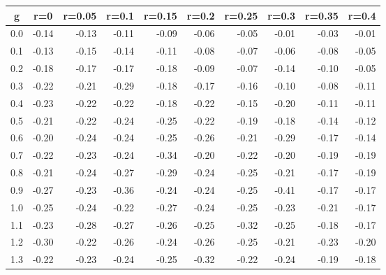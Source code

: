 %
\begin{table}[!tbp]
 \begin{center}
 \begin{tabular}{rrrrrrrrrr}\hline\hline
\multicolumn{1}{c}{g}&\multicolumn{1}{c}{r=0}&\multicolumn{1}{c}{r=0.05}&\multicolumn{1}{c}{r=0.1}&\multicolumn{1}{c}{r=0.15}&\multicolumn{1}{c}{r=0.2}&\multicolumn{1}{c}{r=0.25}&\multicolumn{1}{c}{r=0.3}&\multicolumn{1}{c}{r=0.35}&\multicolumn{1}{c}{r=0.4}\tabularnewline
\hline
0.0&-0.14&-0.13&-0.11&-0.09&-0.06&-0.05&-0.01&-0.03&-0.01\tabularnewline
0.1&-0.13&-0.15&-0.14&-0.11&-0.08&-0.07&-0.06&-0.08&-0.05\tabularnewline
0.2&-0.18&-0.17&-0.17&-0.18&-0.09&-0.07&-0.14&-0.10&-0.05\tabularnewline
0.3&-0.22&-0.21&-0.29&-0.18&-0.17&-0.16&-0.10&-0.08&-0.11\tabularnewline
0.4&-0.23&-0.22&-0.22&-0.18&-0.22&-0.15&-0.20&-0.11&-0.11\tabularnewline
0.5&-0.21&-0.22&-0.24&-0.25&-0.22&-0.19&-0.18&-0.14&-0.12\tabularnewline
0.6&-0.20&-0.24&-0.24&-0.25&-0.26&-0.21&-0.29&-0.17&-0.14\tabularnewline
0.7&-0.22&-0.23&-0.24&-0.34&-0.20&-0.22&-0.20&-0.19&-0.19\tabularnewline
0.8&-0.21&-0.24&-0.27&-0.29&-0.24&-0.25&-0.21&-0.17&-0.19\tabularnewline
0.9&-0.27&-0.23&-0.36&-0.24&-0.24&-0.25&-0.41&-0.17&-0.17\tabularnewline
1.0&-0.25&-0.24&-0.22&-0.27&-0.24&-0.25&-0.23&-0.21&-0.17\tabularnewline
1.1&-0.23&-0.28&-0.27&-0.26&-0.25&-0.32&-0.25&-0.18&-0.17\tabularnewline
1.2&-0.30&-0.22&-0.26&-0.24&-0.26&-0.25&-0.21&-0.23&-0.20\tabularnewline
1.3&-0.22&-0.23&-0.24&-0.25&-0.32&-0.22&-0.24&-0.19&-0.18\tabularnewline
\hline
\end{tabular}

\end{center}

\end{table}

